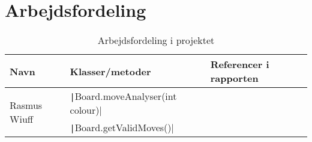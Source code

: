 \appendix
\appendixpage
\addappheadtotoc
\section{Arbejdsfordeling}\label{sec:arbejde}
\begin{table}[H]
    \centering
    \caption{Arbejdsfordeling i projektet}\label{tbl:arbejde}
    \begin{tabular}{lll}
        \toprule
        Navn                          & Klasser/metoder                                   & Referencer i rapporten \\
        \midrule
        \multirow{2}{*}{Rasmus Wiuff} & \texttt|Board.moveAnalyser(int colour)| &                        \\
                                      & \texttt|Board.getValidMoves()|          &                        \\
        \bottomrule
    \end{tabular}
\end{table}